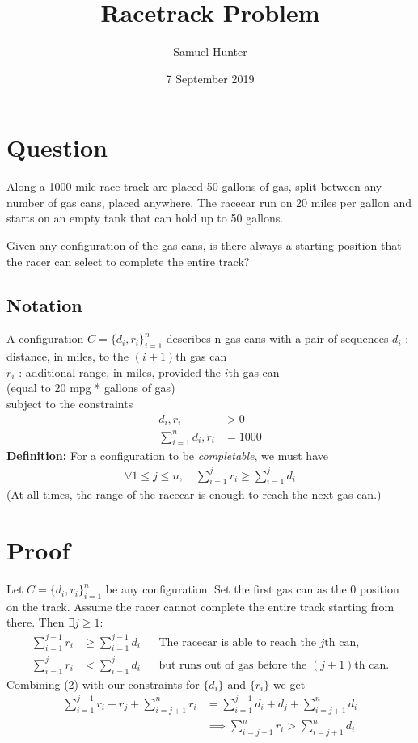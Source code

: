 \documentclass[a4paper,12pt]{article}
\begin{document}
\title{Racetrack Problem}
\author{Samuel Hunter}
\date{7 September 2019}
\maketitle

\section*{Question}
Along a 1000 mile race track are placed 50 gallons of gas, split between any number of gas cans, placed anywhere. The racecar run on 20 miles per gallon and starts on an empty tank that can hold up to 50 gallons.

Given any configuration of the gas cans, is there always a starting position that the racer can select to complete the entire track?

\subsection*{Notation}
A configuration $C = \{d_i, r_i\}_{i=1}^n$ describes n gas cans with a pair of sequences
\indent$d_i$ : distance, in miles, to the $(i+1)$th gas can\\
\indent$r_i$ : additional range, in miles, provided the $i$th gas can\\
\indent\qquad (equal to 20 mpg * gallons of gas)\\
subject to the constraints
\begin{align*}
d_i,r_i &> 0\\
\sum_{i=1}^{n} {d_i,r_i} &= 1000
\end{align*}
\textbf{Definition:} \quad For a configuration to be \emph{completable}, we must have
\begin{align*}
\forall 1 \leq j \leq n, \quad \sum_{i=1}^{j} {r_i} \geq \sum_{i=1}^{j} {d_i}
\end{align*}
(At all times, the range of the racecar is enough to reach the next gas can.)

\pagebreak
\section*{Proof}
Let $C = \{d_i, r_i\}_{i=1}^n$ be any configuration. Set the first gas can as the 0 position on the track. Assume the racer cannot complete the entire track starting from there. Then $\exists j \geq 1 :$
\begin{align}
\sum_{i=1}^{j-1} {r_i} &\geq \sum_{i=1}^{j-1} {d_i} &&\text{The racecar is able to reach the $j$th can,}\\
\sum_{i=1}^{j} {r_i} &< \sum_{i=1}^{j} {d_i} &&\text{but runs out of gas before the $(j+1)$th can.}
\end{align}
Combining (2) with our constraints for $\{d_i\}$ and $\{r_i\}$ we get
\begin{align}
\sum_{i=1}^{j-1} {r_i} + r_j + \sum_{i=j+1}^{n} {r_i} &=
\sum_{i=1}^{j-1} {d_i} + d_j + \sum_{i=j+1}^{n} {d_i}\\
&\implies \sum_{i=j+1}^{n} {r_i} > \sum_{i=j+1}^{n} {d_i}
\end{align}
\end{document}

